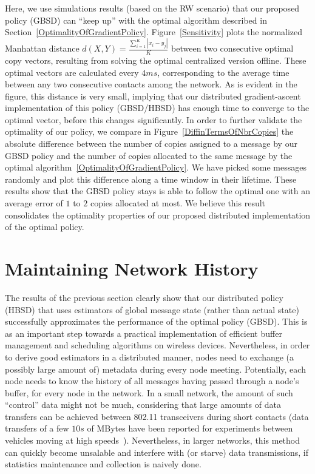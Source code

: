 Here, we use simulations results (based on the RW scenario) that our proposed policy (GBSD) can ``keep up'' with the optimal algorithm described in Section~\ref{OptimalityOfGradientPolicy}. Figure~\ref{Sensitivity} plots the normalized Manhattan distance $d(X,Y) = \frac{\sum_{i=1}^{K}|x_i - y_j|}{K}$ between two consecutive optimal copy vectors, resulting from solving the optimal centralized version offline. These optimal vectors are calculated every $4ms$, corresponding to the average time between any two consecutive contacts among the network. As is evident in the figure, this distance is very small, implying that our distributed gradient-ascent implementation of this policy (GBSD/HBSD) has enough time to converge to the optimal vector, before this changes significantly. In order to further validate the optimality of our policy, we compare in Figure~\ref{DiffinTermsOfNbrCopies} the absolute difference between the number of copies assigned to a message by our GBSD policy and the number of copies allocated to the same message by the optimal algorithm~\ref{OptimalityOfGradientPolicy}. We have picked some messages randomly and plot this difference along a time window in their lifetime. These results show that the GBSD policy stays is able to follow the optimal one with an average error of $1$ to $2$ copies allocated at most. We believe this result consolidates the optimality properties of our proposed distributed implementation of the optimal policy.

\section{Maintaining Network History}
\label{sec:NetworkHistory}

The results of the previous section clearly show that our distributed policy (HBSD) that uses estimators of global message state (rather than actual state) successfully approximates the performance of the optimal policy (GBSD). This is as an important step towards a practical implementation of efficient buffer management and scheduling algorithms on wireless devices. Nevertheless, in order to derive good estimators in a distributed manner, nodes need to exchange (a possibly large amount of) metadata during every node meeting. Potentially, each node needs to know the history of all messages having passed through a node's buffer, for every node in the network. In a small network, the amount of such ``control'' data might not be much, considering that large amounts of data transfers can be achieved between 802.11 transceivers during short contacts (data transfers of a few $10s$ of MBytes have been reported for experiments between vehicles moving at high speeds~\cite{Keshav:Mobisys07}). Nevertheless, in larger networks, this method can quickly become unsalable and interfere with (or starve) data transmissions, if statistics maintenance and collection is naively done.

